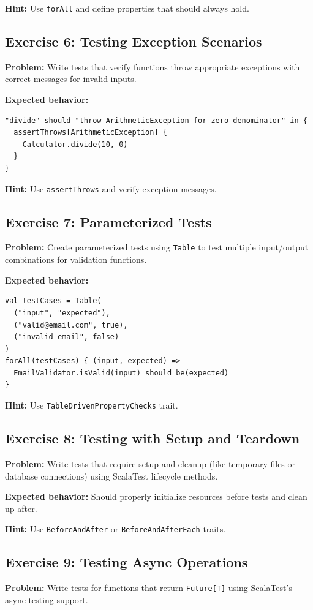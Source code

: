 \documentclass[12pt,a4paper]{article}
\begin{document}
\textbf{Hint:} Use \texttt{forAll} and define properties that should always hold.

\subsection{Exercise 6: Testing Exception Scenarios}
\textbf{Problem:} Write tests that verify functions throw appropriate exceptions with correct messages for invalid inputs.

\textbf{Expected behavior:}
\begin{lstlisting}
"divide" should "throw ArithmeticException for zero denominator" in {
  assertThrows[ArithmeticException] {
    Calculator.divide(10, 0)
  }
}
\end{lstlisting}

\textbf{Hint:} Use \texttt{assertThrows} and verify exception messages.

\subsection{Exercise 7: Parameterized Tests}
\textbf{Problem:} Create parameterized tests using \texttt{Table} to test multiple input/output combinations for validation functions.

\textbf{Expected behavior:}
\begin{lstlisting}
val testCases = Table(
  ("input", "expected"),
  ("valid@email.com", true),
  ("invalid-email", false)
)
forAll(testCases) { (input, expected) =>
  EmailValidator.isValid(input) should be(expected)
}
\end{lstlisting}

\textbf{Hint:} Use \texttt{TableDrivenPropertyChecks} trait.

\subsection{Exercise 8: Testing with Setup and Teardown}
\textbf{Problem:} Write tests that require setup and cleanup (like temporary files or database connections) using ScalaTest lifecycle methods.

\textbf{Expected behavior:} Should properly initialize resources before tests and clean up after.

\textbf{Hint:} Use \texttt{BeforeAndAfter} or \texttt{BeforeAndAfterEach} traits.

\subsection{Exercise 9: Testing Async Operations}
\textbf{Problem:} Write tests for functions that return \texttt{Future[T]} using ScalaTest's async testing support.
\end{document}
